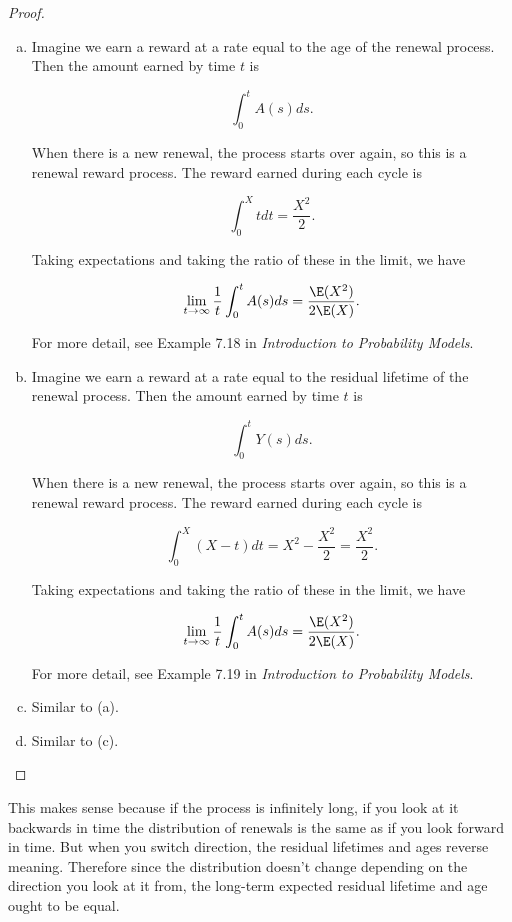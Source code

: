 \begin{proof}

\begin{enumerate}[(a)]

\item Imagine we earn a reward at a rate equal to the age of the renewal process. Then the amount earned by time \(t\) is

\[
\int_0^t A(s) ds.
\]

When there is a new renewal, the process starts over again, so this is a renewal reward process. The reward earned during each cycle is 

\[
\int_0^X t dt = \frac{X^2}{2}.
\]

Taking expectations and taking the ratio of these in the limit, we have

\[
\lim_{t \to \infty} \frac{1}{t} \int_0^t A(s) ds = \frac{\E(X^2)}{2\E(X)}.
\]

For more detail, see Example 7.18 in \textit{Introduction to Probability Models}.

\item Imagine we earn a reward at a rate equal to the residual lifetime of the renewal process. Then the amount earned by time \(t\) is

\[
\int_0^t Y(s) ds.
\]

When there is a new renewal, the process starts over again, so this is a renewal reward process. The reward earned during each cycle is 

\[
\int_0^X(X -  t) dt = X^2 -  \frac{X^2}{2} = \frac{X^2}{2}.
\]

Taking expectations and taking the ratio of these in the limit, we have

\[
\lim_{t \to \infty} \frac{1}{t} \int_0^t A(s) ds = \frac{\E(X^2)}{2\E(X)}.
\]

For more detail, see Example 7.19 in \textit{Introduction to Probability Models}.


\item Similar to (a).

\item Similar to (c).

\end{enumerate}

\end{proof}

\begin{remark} This makes sense because if the process is infinitely long, if you look at it backwards in time the distribution of renewals is the same as if you look forward in time. But when you switch direction, the residual lifetimes and ages reverse meaning. Therefore since the distribution doesn't change depending on the direction you look at it from, the long-term expected residual lifetime and age ought to be equal.

\end{remark}

